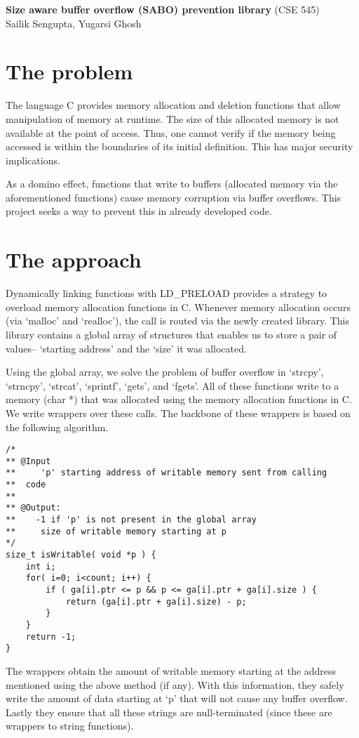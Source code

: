 \documentclass[a4paper, 12pt]{article}
\begin{document}
\noindent
\large\textbf{Size aware buffer overflow (SABO) prevention library} (\normalsize CSE 545)\\
Sailik Sengupta, Yugarsi Ghosh \\

\section{The problem}

The language C provides memory allocation and deletion functions that allow manipulation of memory at runtime. The size of this allocated memory is not available at the point of access. Thus, one cannot verify if the memory being accessed is within the boundaries of its initial definition.  This has major security implications.

As a domino effect, functions that write to buffers (allocated memory via the aforementioned functions) cause memory corruption via buffer overflows.  This project seeks a way to prevent this in already developed code.

\section{The approach}

Dynamically linking functions with LD\_PRELOAD provides a strategy to overload memory allocation functions in C. Whenever memory allocation occurs (via `malloc' and `realloc'), the call is routed via the newly created library.  This library contains a global array of structures that enables us to store a pair of values-- `starting address' and the `size' it was allocated.

Using the global array, we solve the problem of buffer overflow in `strcpy', `strncpy', `strcat', `sprintf', `gets', and `fgets'.  All of these functions write to a memory (char *) that was allocated using the memory allocation functions in C.  We write wrappers over these calls.  The backbone of these wrappers is based on the following algorithm.
\vspace{0.35em}
\lstset{language=C}
\begin{lstlisting}[frame=single]
/*
** @Input
**     'p' starting address of writable memory sent from calling
**	code
**
** @Output:
**    -1 if 'p' is not present in the global array
**     size of writable memory starting at p 
*/
size_t isWritable( void *p ) {
    int i;
    for( i=0; i<count; i++) {
        if ( ga[i].ptr <= p && p <= ga[i].ptr + ga[i].size ) {
            return (ga[i].ptr + ga[i].size) - p;
        }
    }
    return -1;
}
\end{lstlisting}
\vspace{0.35em}
The wrappers obtain the amount of writable memory starting at the address mentioned using the above method (if any).  With this information, they safely write the amount of data starting at `p' that will not cause any buffer overflow.  Lastly they ensure that all these strings are null-terminated (since these are wrappers to string functions).
\end{document}
